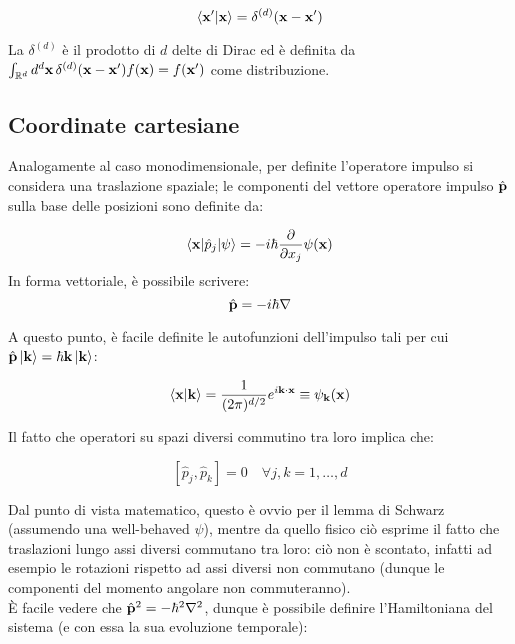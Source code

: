 \begin{equation}
	\braket{\mathbf{x}' | \mathbf{x}} = \delta^{(d)}(\mathbf{x} - \mathbf{x}')
	\label{eq:2}
\end{equation}

La $ \delta^{(d)} $ è il prodotto di $ d $ delte di Dirac ed è definita da $ \int_{\mathbb{R}^d} d^d\mathbf{x} \, \delta^{(d)}(\mathbf{x} - \mathbf{x}') f(\mathbf{x}) = f(\mathbf{x}') $ come distribuzione.

\subsection{Coordinate cartesiane}

Analogamente al caso monodimensionale, per definite l'operatore impulso si considera una traslazione spaziale; le componenti del vettore operatore impulso $ \hat{\mathbf{p}} $ sulla base delle posizioni sono definite da:

\begin{equation}
  \braket{\mathbf{x} | \hat{p}_j | \psi} = - i\hbar \frac{\partial}{\partial x_j} \psi(\mathbf{x})
	\label{eq:3}
\end{equation}
In forma vettoriale, è possibile scrivere:
\begin{equation}
	\hat{\mathbf{p}} = -i\hbar\nabla
	\label{eq:4}
\end{equation}

A questo punto, è facile definite le autofunzioni dell'impulso tali per cui $ \hat{\mathbf{p}}\ket{\mathbf{k}} = \hbar \mathbf{k}\ket{\mathbf{k}} $:

\begin{equation}
	\braket{\mathbf{x} | \mathbf{k}} = \frac{1}{(2\pi)^{d/2}} e^{i \mathbf{k}\cdot\mathbf{x}} \equiv \psi_{\mathbf{k}}(\mathbf{x})
	\label{eq:5}
\end{equation}

Il fatto che operatori su spazi diversi commutino tra loro implica che:

\begin{equation}
	\left[ \hat{p}_j, \hat{p}_k \right] = 0 \quad \forall j,k = 1, \dots, d
	\label{eq:6}
\end{equation}

Dal punto di vista matematico, questo è ovvio per il lemma di Schwarz (assumendo una well-behaved $ \psi $), mentre da quello fisico ciò esprime il fatto che traslazioni lungo assi diversi commutano tra loro: ciò non è scontato, infatti ad esempio le rotazioni rispetto ad assi diversi non commutano (dunque le componenti del momento angolare non commuteranno).\\
%
È facile vedere che $ \hat{\mathbf{p}}^2 = -\hbar^2 \nabla^2 $, dunque è possibile definire l'Hamiltoniana del sistema (e con essa la sua evoluzione temporale):

